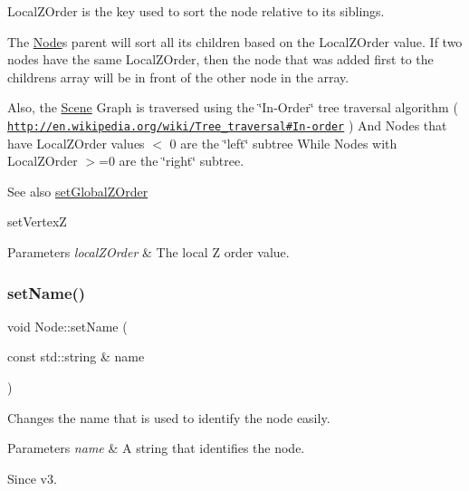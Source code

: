 Local\+Z\+Order is the \textquotesingle{}key\textquotesingle{} used to sort the node relative to its siblings.

The \hyperlink{classNode}{Node}\textquotesingle{}s parent will sort all its children based on the Local\+Z\+Order value. If two nodes have the same Local\+Z\+Order, then the node that was added first to the children\textquotesingle{}s array will be in front of the other node in the array.

Also, the \hyperlink{classScene}{Scene} Graph is traversed using the \char`\"{}\+In-\/\+Order\char`\"{} tree traversal algorithm ( \href{http://en.wikipedia.org/wiki/Tree_traversal#In-order}{\tt http\+://en.\+wikipedia.\+org/wiki/\+Tree\+\_\+traversal\#\+In-\/order} ) And Nodes that have Local\+Z\+Order values $<$ 0 are the \char`\"{}left\char`\"{} subtree While Nodes with Local\+Z\+Order $>$=0 are the \char`\"{}right\char`\"{} subtree.

\begin{DoxySeeAlso}{See also}
{\ttfamily \hyperlink{classNode_a32a5b9cb9a408d04008c4935a4776566}{set\+Global\+Z\+Order}} 

{\ttfamily set\+VertexZ}
\end{DoxySeeAlso}

\begin{DoxyParams}{Parameters}
{\em local\+Z\+Order} & The local Z order value. \\
\hline
\end{DoxyParams}
\mbox{\label{classNode_a519730c66b26e65c6539a908e6905edc}} 
\subsubsection{\texorpdfstring{set\+Name()}{setName()}\hspace{0.1cm}{\footnotesize\ttfamily [1/2]}}
{\footnotesize\ttfamily void Node\+::set\+Name (\begin{DoxyParamCaption}\item[{const std\+::string \&}]{name }\end{DoxyParamCaption})\hspace{0.3cm}{\ttfamily [virtual]}}

Changes the name that is used to identify the node easily. 
\begin{DoxyParams}{Parameters}
{\em name} & A string that identifies the node.\\
\hline
\end{DoxyParams}
\begin{DoxySince}{Since}
v3. 
\end{DoxySince}
\mbox{\label{classNode_a09a7d879835c2d3fbcbcdcd8f415938a}} 
